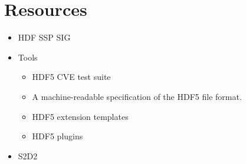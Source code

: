 \documentclass[../main.tex]{subfiles}
\begin{document}
\section{Resources}
\label{sec:resources}

\begin{itemize}
    \item HDF SSP SIG~\cite{hdf5-ssp-sig}
    \item Tools
    \begin{itemize}
        \item HDF5 CVE test suite~\cite{cve_hdf5}
        \item A machine-readable specification of the HDF5 file format.~\cite{hdf5-pickles}
        \item HDF5 extension templates~\cite{hdf5-boneyard}
        \item HDF5 plugins~\cite{hdf5_plugins}
    \end{itemize}
    \item S2D2
\end{itemize}
\end{document}

